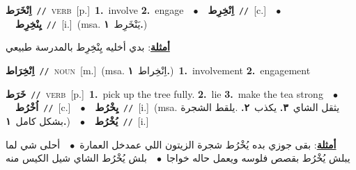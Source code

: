 \documentclass[10pt,a4paper,twoside]{article} %
\begin{document}
\begin{multicols}{2}
{\setlength\topsep{0pt}\textbf{\foreignlanguage{arabic}{اِنْخَرَط}}\ {\color{gray}\texttt{//}\color{black}}\ \textsc{verb}\ [p.]\ \textbf{1.}~involve  \textbf{2.}~engage\ \ $\bullet$\ \ \setlength\topsep{0pt}\textbf{\foreignlanguage{arabic}{اِنْخِرِط}}\ {\color{gray}\texttt{//}\color{black}}\ [c.]\ \ $\bullet$\ \ \setlength\topsep{0pt}\textbf{\foreignlanguage{arabic}{يِنْخِرِط}}\ {\color{gray}\texttt{//}\color{black}}\ [i.]\ \color{gray}(msa. \foreignlanguage{arabic}{يَنْخَرِط}~\foreignlanguage{arabic}{\textbf{١.}})\color{black}\  \begin{flushright}\color{gray}\foreignlanguage{arabic}{\textbf{\underline{\foreignlanguage{arabic}{أمثلة}}}: بدي أخليه يِنْخِرِط بالمدرسة طبيعي}\end{flushright}\color{black}} \vspace{2mm}

{\setlength\topsep{0pt}\textbf{\foreignlanguage{arabic}{اِنْخِرَاط}}\ {\color{gray}\texttt{//}\color{black}}\ \textsc{noun}\ [m.]\ \color{gray}(msa. \foreignlanguage{arabic}{اِنْخِراط}~\foreignlanguage{arabic}{\textbf{١.}})\color{black}\ \textbf{1.}~involvement  \textbf{2.}~engagement\ } \vspace{2mm}

{\setlength\topsep{0pt}\textbf{\foreignlanguage{arabic}{خَرَط}}\ {\color{gray}\texttt{//}\color{black}}\ \textsc{verb}\ [p.]\ \textbf{1.}~pick up the tree fully.  \textbf{2.}~lie  \textbf{3.}~make the tea strong\ \ $\bullet$\ \ \setlength\topsep{0pt}\textbf{\foreignlanguage{arabic}{اُخْرُط}}\ {\color{gray}\texttt{//}\color{black}}\ [c.]\ \ $\bullet$\ \ \setlength\topsep{0pt}\textbf{\foreignlanguage{arabic}{يِخْرُط}}\ {\color{gray}\texttt{//}\color{black}}\ [i.]\ \color{gray}(msa. \foreignlanguage{arabic}{يثقل الشاي}~\foreignlanguage{arabic}{\textbf{٣.}}  \foreignlanguage{arabic}{يكذب}~\foreignlanguage{arabic}{\textbf{٢.}}  .\foreignlanguage{arabic}{يلقط الشجرة بشكل كامل}~\foreignlanguage{arabic}{\textbf{١.}})\color{black}\ \ $\bullet$\ \ \setlength\topsep{0pt}\textbf{\foreignlanguage{arabic}{يُخْرُط}}\ {\color{gray}\texttt{//}\color{black}}\ [i.]\  \begin{flushright}\color{gray}\foreignlanguage{arabic}{\textbf{\underline{\foreignlanguage{arabic}{أمثلة}}}: بقى جوزي بده يُخْرُط شجرة الزيتون اللي عمدخل العمارة\ $\bullet$\ \  أحلى شي لما يبلش يُخْرُط بقصص فلوسه ويعمل حاله خواجا\ $\bullet$\ \  بلش يُخْرُط الشاي شيل الكيس منه}\end{flushright}\color{black}} \vspace{2mm}


\end{multicols}
\end{document}
